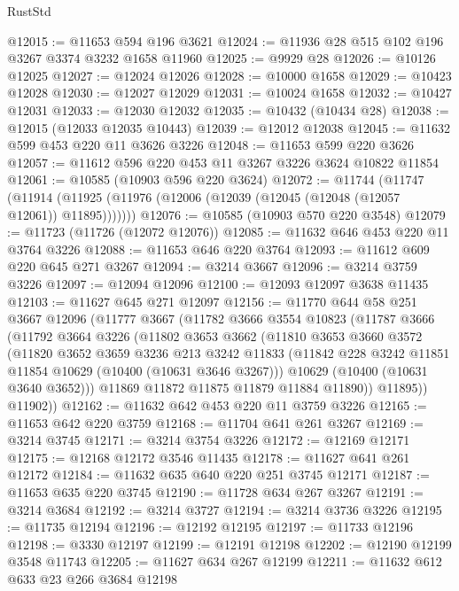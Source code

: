 \begin{lexlean}{RustStd}
\begin{coremodule}
@12015 := @11653 @594 @196 @3621
@12024 := @11936 @28 @515 @102 @196 @3267 @3374 @3232 @1658 @11960
@12025 := @9929 @28
@12026 := @10126 @12025
@12027 := @12024 @12026
@12028 := @10000 @1658
@12029 := @10423 @12028
@12030 := @12027 @12029
@12031 := @10024 @1658
@12032 := @10427 @12031
@12033 := @12030 @12032
@12035 := @10432 (@10434 @28)
@12038 := @12015 (@12033 @12035 @10443)
@12039 := @12012 @12038
@12045 := @11632 @599 @453 @220 @11 @3626 @3226
@12048 := @11653 @599 @220 @3626
@12057 := @11612 @596 @220 @453 @11 @3267 @3226 @3624 @10822 @11854
@12061 := @10585 (@10903 @596 @220 @3624)
@12072 := @11744
    (@11747 (@11914 (@11925 (@11976 (@12006 (@12039 (@12045 (@12048 (@12057 @12061)) @11895)))))))
@12076 := @10585 (@10903 @570 @220 @3548)
@12079 := @11723 (@11726 (@12072 @12076))
@12085 := @11632 @646 @453 @220 @11 @3764 @3226
@12088 := @11653 @646 @220 @3764
@12093 := @11612 @609 @220 @645 @271 @3267
@12094 := @3214 @3667
@12096 := @3214 @3759 @3226
@12097 := @12094 @12096
@12100 := @12093 @12097 @3638 @11435
@12103 := @11627 @645 @271 @12097
@12156 := @11770
    @644
    @58
    @251
    @3667
    @12096
    (@11777
      @3667
      (@11782
        @3666
        @3554
        @10823
        (@11787
          @3666
          (@11792
            @3664
            @3226
            (@11802
              @3653
              @3662
              (@11810
                @3653
                @3660
                @3572
                (@11820
                  @3652
                  @3659
                  @3236
                  @213
                  @3242
                  @11833
                  (@11842 @228 @3242 @11851 @11854 @10629 (@10400 (@10631 @3646 @3267)))
                  @10629
                  (@10400 (@10631 @3640 @3652)))
                @11869
                @11872
                @11875
                @11879
                @11884
                @11890))
            @11895))
        @11902))
@12162 := @11632 @642 @453 @220 @11 @3759 @3226
@12165 := @11653 @642 @220 @3759
@12168 := @11704 @641 @261 @3267
@12169 := @3214 @3745
@12171 := @3214 @3754 @3226
@12172 := @12169 @12171
@12175 := @12168 @12172 @3546 @11435
@12178 := @11627 @641 @261 @12172
@12184 := @11632 @635 @640 @220 @251 @3745 @12171
@12187 := @11653 @635 @220 @3745
@12190 := @11728 @634 @267 @3267
@12191 := @3214 @3684
@12192 := @3214 @3727
@12194 := @3214 @3736 @3226
@12195 := @11735 @12194
@12196 := @12192 @12195
@12197 := @11733 @12196
@12198 := @3330 @12197
@12199 := @12191 @12198
@12202 := @12190 @12199 @3548 @11743
@12205 := @11627 @634 @267 @12199
@12211 := @11632 @612 @633 @23 @266 @3684 @12198

\end{coremodule}
\end{lexlean}
